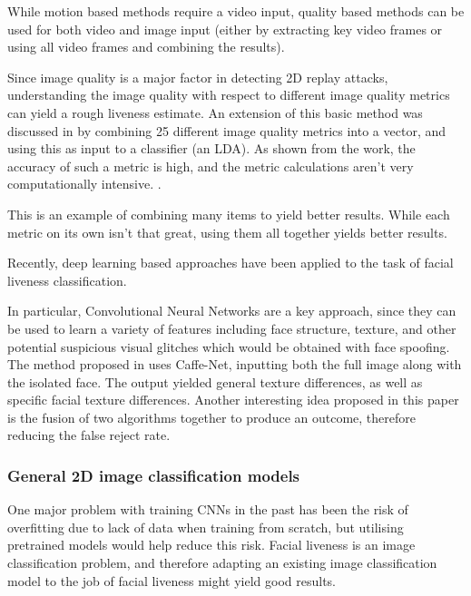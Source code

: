 \documentclass[11pt,a4paper]{article}
\begin{document}
        While motion based methods require a video input, quality based methods can be used for both video and image input (either by extracting key video frames or using all video frames and combining the results).

        Since image quality is a major factor in detecting 2D replay attacks, understanding the image quality with respect to different image quality metrics can yield a rough liveness estimate.
        An extension of this basic method was discussed in \cite{ImageQualityAssessmentTest} by combining 25 different image quality metrics into a vector, and using this as input to a classifier (an LDA).
        As shown from the work, the accuracy of such a metric is high, and the metric calculations aren't very computationally intensive. \cite{ImageQualityAssessmentTest}.
        
        This is an example of combining many items to yield better results. While each metric on its own isn't that great, using them all together yields better results.
        
        Recently, deep learning based approaches have been applied to the task of facial liveness classification.

        In particular, Convolutional Neural Networks are a key approach, since they can be used to learn a variety of features including face structure,
        texture, and other potential suspicious visual glitches which would be obtained with face spoofing.
        The method proposed in \cite{Patel2016CrossDatabaseFA} uses Caffe-Net, inputting both the full image along with the isolated face.
        The output yielded general texture differences, as well as specific facial texture differences. Another interesting idea proposed
        in this paper is the fusion of two algorithms together to produce an outcome, therefore reducing the false reject rate.
        
        \subsubsection{General 2D image classification models}
        One major problem with training CNNs in the past has been the risk of overfitting due to lack of data when training from scratch, but utilising pretrained models would help reduce this risk.
        Facial liveness is an image classification problem, and therefore adapting an existing image classification model to the job of facial liveness might yield good results. 
\end{document}
